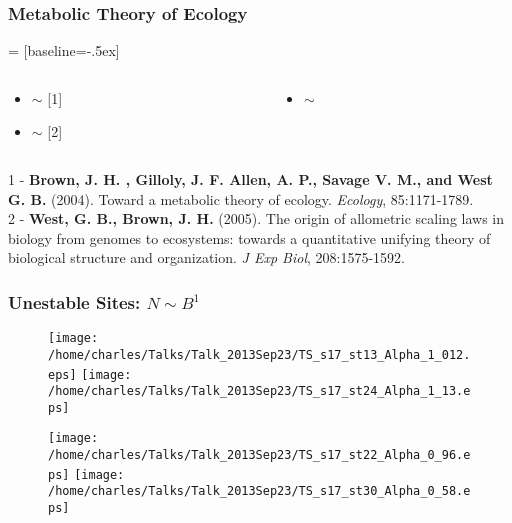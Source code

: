 \documentclass[xcolor=x11names,compress]{beamer}
\renewcommand{\(}{\begin{columns}}
\renewcommand{\)}{\end{columns}}
\newcommand{\<}[1]{\begin{column}{#1}}
\renewcommand{\>}{\end{column}}
\begin{document}
\begin{frame}
\frametitle{Metabolic Theory of Ecology}
 = [baseline=-.5ex]

\begin{columns}
  \begin{column}{0.5\textwidth}
    \begin{itemize}
	\item {} $\sim$  \tiny[1]
	\item {} $\sim$  \tiny[2]
    \end{itemize}
  \end{column}

  \begin{column}{0.5\textwidth}
     \begin{itemize}[<2->]
	\item {} $\sim$ 
     \end{itemize}
  \end{column}
\end{columns}
\vspace{1cm}
\begin{block}{}
{\footnotesize 1 - \textbf{Brown, J. H. , Gilloly, J. F. Allen, A. P., Savage V. M., and West G. B.} (2004). Toward a metabolic theory of ecology. \emph{Ecology}, 85:1171-1789.} \\
{\footnotesize 2 - \textbf{West, G. B., Brown, J. H.} (2005). The origin of allometric scaling laws in biology from genomes to ecosystems: towards a quantitative unifying theory of biological structure and organization. \emph{J Exp Biol}, 208:1575-1592.}
\end{block}
\end{frame}

\begin{frame}
\frametitle{Unestable Sites: $N \sim B^{1}$}
\begin{figure}
\texttt{[image: /home/charles/Talks/Talk\_2013Sep23/TS\_s17\_st13\_Alpha\_1\_012.eps]}
\texttt{[image: /home/charles/Talks/Talk\_2013Sep23/TS\_s17\_st24\_Alpha\_1\_13.eps]}
\end{figure}
\begin{figure}
\texttt{[image: /home/charles/Talks/Talk\_2013Sep23/TS\_s17\_st22\_Alpha\_0\_96.eps]}
\texttt{[image: /home/charles/Talks/Talk\_2013Sep23/TS\_s17\_st30\_Alpha\_0\_58.eps]}
\end{figure}
\end{frame}
\end{document}
